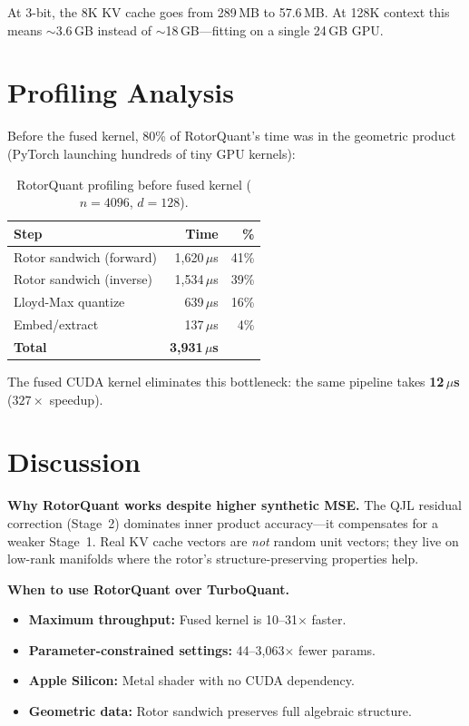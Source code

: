 \documentclass[10pt,twocolumn]{article}
\begin{document}
At 3-bit, the 8K KV cache goes from 289\,MB to 57.6\,MB.
At 128K context this means $\sim$3.6\,GB instead of $\sim$18\,GB---fitting on a single 24\,GB GPU.

\section{Profiling Analysis}
\label{sec:profiling}

Before the fused kernel, 80\% of RotorQuant's time was in the geometric product (PyTorch launching hundreds of tiny GPU kernels):

\begin{table}[h]
\centering
\caption{RotorQuant profiling before fused kernel ($n=4096$, $d=128$).}
\label{tab:profiling}
\begin{tabular}{@{}lrr@{}}
\toprule
Step & Time & \% \\
\midrule
Rotor sandwich (forward) & 1,620\,$\mu$s & 41\% \\
Rotor sandwich (inverse) & 1,534\,$\mu$s & 39\% \\
Lloyd-Max quantize & 639\,$\mu$s & 16\% \\
Embed/extract & 137\,$\mu$s & 4\% \\
\midrule
\textbf{Total} & \textbf{3,931\,$\mu$s} & \\
\bottomrule
\end{tabular}
\end{table}

The fused CUDA kernel eliminates this bottleneck: the same pipeline takes \textbf{12\,$\mu$s} ($327\times$ speedup).

\section{Discussion}
\label{sec:discussion}

\textbf{Why RotorQuant works despite higher synthetic MSE.}
The QJL residual correction (Stage~2) dominates inner product accuracy---it compensates for a weaker Stage~1.
Real KV cache vectors are \emph{not} random unit vectors; they live on low-rank manifolds where the rotor's structure-preserving properties help.

\textbf{When to use RotorQuant over TurboQuant.}
\begin{itemize}[nosep]
  \item \textbf{Maximum throughput:} Fused kernel is 10--31$\times$ faster.
  \item \textbf{Parameter-constrained settings:} 44--3,063$\times$ fewer params.
  \item \textbf{Apple Silicon:} Metal shader with no CUDA dependency.
  \item \textbf{Geometric data:} Rotor sandwich preserves full algebraic structure.
\end{itemize}
\end{document}

